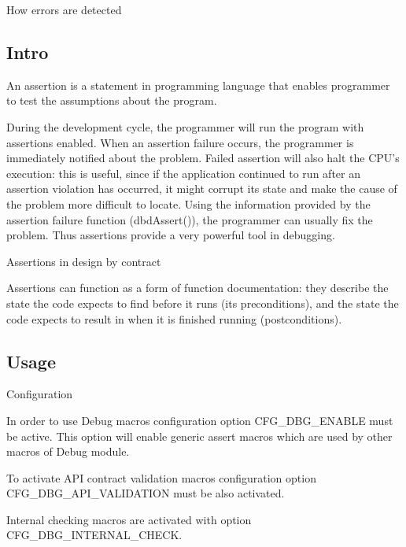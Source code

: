 How errors are detected\hypertarget{errors_errors_intro}{}\subsection{Intro}\label{errors_errors_intro}
An assertion is a statement in programming language that enables programmer to test the assumptions about the program.

During the development cycle, the programmer will run the program with assertions enabled. When an assertion failure occurs, the programmer is immediately notified about the problem. Failed assertion will also halt the C\-P\-U's execution\-: this is useful, since if the application continued to run after an assertion violation has occurred, it might corrupt its state and make the cause of the problem more difficult to locate. Using the information provided by the assertion failure function (dbd\-Assert()), the programmer can usually fix the problem. Thus assertions provide a very powerful tool in debugging.

\begin{DoxyParagraph}{Assertions in design by contract}

\end{DoxyParagraph}
Assertions can function as a form of function documentation\-: they describe the state the code expects to find before it runs (its preconditions), and the state the code expects to result in when it is finished running (postconditions).\hypertarget{errors_errors_usage}{}\subsection{Usage}\label{errors_errors_usage}
\begin{DoxyParagraph}{Configuration}

\end{DoxyParagraph}
In order to use Debug macros configuration option C\-F\-G\-\_\-\-D\-B\-G\-\_\-\-E\-N\-A\-B\-L\-E must be active. This option will enable generic assert macros which are used by other macros of Debug module.

To activate A\-P\-I contract validation macros configuration option C\-F\-G\-\_\-\-D\-B\-G\-\_\-\-A\-P\-I\-\_\-\-V\-A\-L\-I\-D\-A\-T\-I\-O\-N must be also activated.

Internal checking macros are activated with option C\-F\-G\-\_\-\-D\-B\-G\-\_\-\-I\-N\-T\-E\-R\-N\-A\-L\-\_\-\-C\-H\-E\-C\-K. 